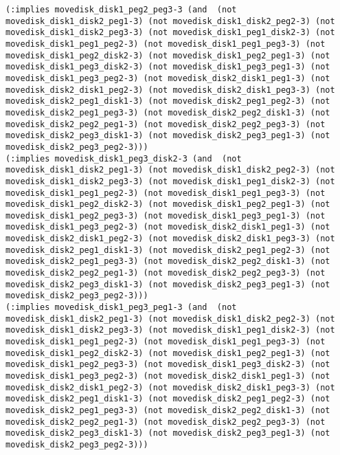 \documentclass[12pt,letterpaper]{ntdhw}
\begin{document}
\begin{enumerate}
\begin{enumerate}
\begin{lstlisting}[language=pddl, style=pddlstyle,
  basicstyle=\scriptsize]
(:implies movedisk_disk1_peg2_peg3-3 (and  (not movedisk_disk1_disk2_peg1-3) (not movedisk_disk1_disk2_peg2-3) (not movedisk_disk1_disk2_peg3-3) (not movedisk_disk1_peg1_disk2-3) (not movedisk_disk1_peg1_peg2-3) (not movedisk_disk1_peg1_peg3-3) (not movedisk_disk1_peg2_disk2-3) (not movedisk_disk1_peg2_peg1-3) (not movedisk_disk1_peg3_disk2-3) (not movedisk_disk1_peg3_peg1-3) (not movedisk_disk1_peg3_peg2-3) (not movedisk_disk2_disk1_peg1-3) (not movedisk_disk2_disk1_peg2-3) (not movedisk_disk2_disk1_peg3-3) (not movedisk_disk2_peg1_disk1-3) (not movedisk_disk2_peg1_peg2-3) (not movedisk_disk2_peg1_peg3-3) (not movedisk_disk2_peg2_disk1-3) (not movedisk_disk2_peg2_peg1-3) (not movedisk_disk2_peg2_peg3-3) (not movedisk_disk2_peg3_disk1-3) (not movedisk_disk2_peg3_peg1-3) (not movedisk_disk2_peg3_peg2-3)))
(:implies movedisk_disk1_peg3_disk2-3 (and  (not movedisk_disk1_disk2_peg1-3) (not movedisk_disk1_disk2_peg2-3) (not movedisk_disk1_disk2_peg3-3) (not movedisk_disk1_peg1_disk2-3) (not movedisk_disk1_peg1_peg2-3) (not movedisk_disk1_peg1_peg3-3) (not movedisk_disk1_peg2_disk2-3) (not movedisk_disk1_peg2_peg1-3) (not movedisk_disk1_peg2_peg3-3) (not movedisk_disk1_peg3_peg1-3) (not movedisk_disk1_peg3_peg2-3) (not movedisk_disk2_disk1_peg1-3) (not movedisk_disk2_disk1_peg2-3) (not movedisk_disk2_disk1_peg3-3) (not movedisk_disk2_peg1_disk1-3) (not movedisk_disk2_peg1_peg2-3) (not movedisk_disk2_peg1_peg3-3) (not movedisk_disk2_peg2_disk1-3) (not movedisk_disk2_peg2_peg1-3) (not movedisk_disk2_peg2_peg3-3) (not movedisk_disk2_peg3_disk1-3) (not movedisk_disk2_peg3_peg1-3) (not movedisk_disk2_peg3_peg2-3)))
(:implies movedisk_disk1_peg3_peg1-3 (and  (not movedisk_disk1_disk2_peg1-3) (not movedisk_disk1_disk2_peg2-3) (not movedisk_disk1_disk2_peg3-3) (not movedisk_disk1_peg1_disk2-3) (not movedisk_disk1_peg1_peg2-3) (not movedisk_disk1_peg1_peg3-3) (not movedisk_disk1_peg2_disk2-3) (not movedisk_disk1_peg2_peg1-3) (not movedisk_disk1_peg2_peg3-3) (not movedisk_disk1_peg3_disk2-3) (not movedisk_disk1_peg3_peg2-3) (not movedisk_disk2_disk1_peg1-3) (not movedisk_disk2_disk1_peg2-3) (not movedisk_disk2_disk1_peg3-3) (not movedisk_disk2_peg1_disk1-3) (not movedisk_disk2_peg1_peg2-3) (not movedisk_disk2_peg1_peg3-3) (not movedisk_disk2_peg2_disk1-3) (not movedisk_disk2_peg2_peg1-3) (not movedisk_disk2_peg2_peg3-3) (not movedisk_disk2_peg3_disk1-3) (not movedisk_disk2_peg3_peg1-3) (not movedisk_disk2_peg3_peg2-3)))

\end{lstlisting}
\end{enumerate}
\end{enumerate}
\end{document}
